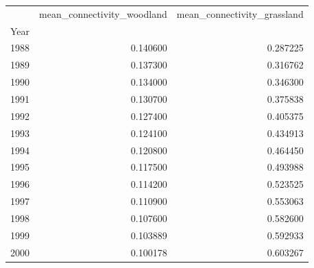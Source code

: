 \begin{tabular}{lrr}
\toprule
 & mean_connectivity_woodland & mean_connectivity_grassland \\
Year &  &  \\
\midrule
1988 & 0.140600 & 0.287225 \\
1989 & 0.137300 & 0.316762 \\
1990 & 0.134000 & 0.346300 \\
1991 & 0.130700 & 0.375838 \\
1992 & 0.127400 & 0.405375 \\
1993 & 0.124100 & 0.434913 \\
1994 & 0.120800 & 0.464450 \\
1995 & 0.117500 & 0.493988 \\
1996 & 0.114200 & 0.523525 \\
1997 & 0.110900 & 0.553063 \\
1998 & 0.107600 & 0.582600 \\
1999 & 0.103889 & 0.592933 \\
2000 & 0.100178 & 0.603267 \\
\bottomrule
\end{tabular}
